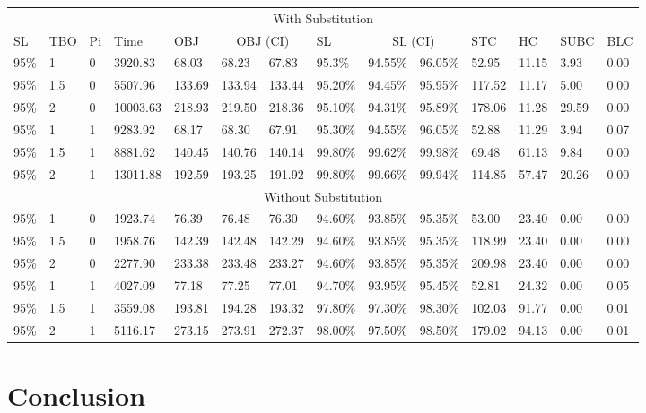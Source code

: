 \documentclass[10pt]{article}
\begin{document}
\begin{table}[]
\begin{tabular}{llllllllllllll}
\multicolumn{14}{c}{With Substitution} \\
SL & TBO & Pi & Time & OBJ & \multicolumn{2}{c}{OBJ (CI)} & SL & \multicolumn{2}{c}{SL (CI)} & STC & HC & SUBC & BLC \\
95\% & 1 & 0 & 3920.83 & 68.03 & 68.23 & 67.83 & 95.3\% & 94.55\% & 96.05\% & 52.95 & 11.15 & 3.93 & 0.00 \\
95\% & 1.5 & 0 & 5507.96 & 133.69 & 133.94 & 133.44 & 95.20\% & 94.45\% & 95.95\% & 117.52 & 11.17 & 5.00 & 0.00 \\
95\% & 2 & 0 & 10003.63 & 218.93 & 219.50 & 218.36 & 95.10\% & 94.31\% & 95.89\% & 178.06 & 11.28 & 29.59 & 0.00 \\
95\% & 1 & 1 & 9283.92 & 68.17 & 68.30 & 67.91 & 95.30\% & 94.55\% & 96.05\% & 52.88 & 11.29 & 3.94 & 0.07 \\
95\% & 1.5 & 1 & 8881.62 & 140.45 & 140.76 & 140.14 & 99.80\% & 99.62\% & 99.98\% & 69.48 & 61.13 & 9.84 & 0.00 \\
95\% & 2 & 1 & 13011.88 & 192.59 & 193.25 & 191.92 & 99.80\% & 99.66\% & 99.94\% & 114.85 & 57.47 & 20.26 & 0.00 \\
\multicolumn{14}{c}{Without Substitution} \\
95\% & 1 & 0 & 1923.74 & 76.39 & 76.48 & 76.30 & 94.60\% & 93.85\% & 95.35\% & 53.00 & 23.40 & 0.00 & 0.00 \\
95\% & 1.5 & 0 & 1958.76 & 142.39 & 142.48 & 142.29 & 94.60\% & 93.85\% & 95.35\% & 118.99 & 23.40 & 0.00 & 0.00 \\
95\% & 2 & 0 & 2277.90 & 233.38 & 233.48 & 233.27 & 94.60\% & 93.85\% & 95.35\% & 209.98 & 23.40 & 0.00 & 0.00 \\
95\% & 1 & 1 & 4027.09 & 77.18 & 77.25 & 77.01 & 94.70\% & 93.95\% & 95.45\% & 52.81 & 24.32 & 0.00 & 0.05 \\
95\% & 1.5 & 1 & 3559.08 & 193.81 & 194.28 & 193.32 & 97.80\% & 97.30\% & 98.30\% & 102.03 & 91.77 & 0.00 & 0.01 \\
95\% & 2 & 1 & 5116.17 & 273.15 & 273.91 & 272.37 & 98.00\% & 97.50\% & 98.50\% & 179.02 & 94.13 & 0.00 & 0.01
\end{tabular}
\end{table}

\section{Conclusion}
\end{document}
